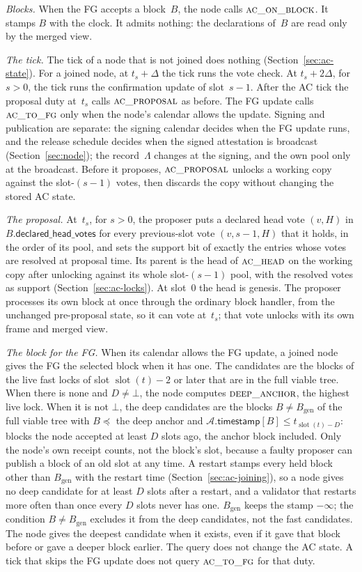 \documentclass{article}
\newcommand{\genesis}{B_{\mathrm{gen}}}
\newcommand{\slot}{\operatorname{slot}}
\newcommand{\AC}{\mathcal A}
\newcommand{\timestamp}{\mathsf{timestamp}}
\begin{document}
\emph{Blocks.}  When the FG accepts a block~$B$, the node calls
$\Call{ac\_on\_block}{}$.  It stamps $B$ with the clock.  It admits
nothing: the declarations of~$B$ are read only by the merged view.

\emph{The tick.}  The tick of a node that is not joined does nothing
(Section~\ref{sec:ac-state}).  For a joined node, at $t_s+\Delta$ the tick
runs the vote check.  At
$t_s+2\Delta$, for $s>0$, the tick runs the confirmation update of
slot~$s-1$.  After the AC tick the proposal duty at~$t_s$ calls
$\Call{ac\_proposal}{}$ as before.  The FG update calls
$\Call{ac\_to\_fg}{}$ only when the node's calendar allows the update.
Signing and publication are separate: the signing calendar decides when the
FG update runs, and the release schedule decides when the signed attestation
is broadcast (Section~\ref{sec:node}); the record~$\Lambda$ changes at the
signing, and the own pool only at the broadcast.
Before it proposes, $\Call{ac\_proposal}{}$ unlocks a working copy against the
slot-$(s-1)$ votes, then discards the copy without changing the stored AC state.

\emph{The proposal.}  At~$t_s$, for $s>0$, the proposer puts a declared head
vote $(v,H)$ in $B.\mathsf{declared\_head\_votes}$ for every previous-slot vote
$(v,s-1,H)$ that it holds, in the order of its pool, and sets the support
bit of exactly the entries whose votes are resolved at proposal time.  Its parent is the head of
$\Call{ac\_head}{}$ on the working copy after unlocking against its whole slot-$(s-1)$
pool, with the resolved votes as support (Section~\ref{sec:ac-locks}).
At slot~$0$ the head is genesis.  The proposer processes its own block at
once through the ordinary block handler, from the unchanged pre-proposal state,
so it can vote at~$t_s$; that vote unlocks with its own frame and merged view.

\emph{The block for the FG.}  When its calendar allows the FG update,
a joined node gives the FG the selected block when it has one.  The candidates are the blocks of the live
fast locks of slot $\slot(t)-2$ or later that are in the full viable
tree.  When there is none and $D\neq\bot$, the node computes
$\Call{deep\_anchor}{}$, the highest live lock.  When it is not $\bot$, the deep candidates are the
blocks $B\neq\genesis$ of the full viable tree with $B\preceq$ the deep anchor
and $\AC.\timestamp[B]\leq t_{\slot(t)-D}$: blocks the node accepted at least
$D$ slots ago, the anchor block included.  Only the node's own receipt counts,
not the block's slot, because a faulty proposer can publish a block of an old
slot at any time.  A restart stamps every held block other than $\genesis$
with the restart time (Section~\ref{sec:ac-joining}), so a node gives no deep
candidate for at least $D$ slots after a restart, and a validator that restarts
more often than once every $D$ slots never has one.  $\genesis$ keeps the
stamp $-\infty$; the condition $B\neq\genesis$ excludes it from the deep
candidates, not the fast candidates.  The node gives the deepest candidate
when it exists, even if it gave that block before or gave a deeper block
earlier.  The query does not change the AC state.  A tick that skips the FG
update does not query $\Call{ac\_to\_fg}{}$ for that duty.
\end{document}
